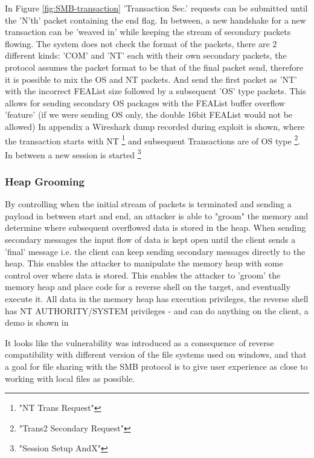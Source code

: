 \documentclass[
	letterpaper, %
	10pt, %
	unnumberedsections, %
	twoside, %
]{LTJournalArticle}
\begin{document}
In Figure \ref{fig:SMB-transaction} 'Transaction Sec.' requests can be submitted until the 'N'th' packet containing the end flag. In between, a new handshake for a new transaction can be 'weaved in' while keeping the stream of secondary packets flowing. The system does not check the format of the packets, there are 2 different kinds: 'COM' and 'NT' each with their own secondary packets, the protocol assumes the packet format to be that of the final packet send, therefore it is possible to mix the OS and NT packets. And send the first packet as 'NT' with the incorrect FEAList size followed by a subsequent 'OS' type packets. This allows for sending secondary OS packages with the FEAList buffer overflow 'feature' (if we were sending OS only, the double 16bit FEAList would not be allowed)
\newline
In appendix a Wireshark dump recorded during exploit is shown, where the transaction starts with NT \footnote{"NT Trans Request"} and subsequent Transactions are of OS type \footnote{"Trans2 Secondary Request"}. In between a new session is started \footnote{"Session Setup AndX"}      

\subsubsection{Heap Grooming}
By controlling when the initial stream of packets is terminated and sending a payload in between start and end, an attacker is able to "groom" the memory and determine where subsequent overflowed data is stored in the heap. When sending secondary messages the input flow of data is kept open until the client sends a 'final' message i.e. the client can keep sending secondary messages directly to the heap. This enables the attacker to manipulate the memory heap with some control over where data is stored. This enables the attacker to 'groom' \cite{zerosum0x0-defcon26} the memory heap and place code for a reverse shell on the target, and eventually execute it. All data in the memory heap has execution privileges, the reverse shell has NT AUTHORITY/SYSTEM privileges - and can do anything on the client, a demo is shown in       



It looks like the vulnerability was introduced as a consequence of reverse compatibility with different version of the file systems used on windows, and that a goal for file sharing with the SMB protocol is to give user experience as close to working with local files as possible.  
\end{document}
